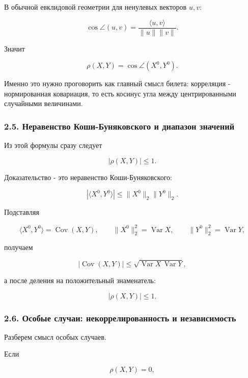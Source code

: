 \documentclass[
  11pt,
  a4paper,
]{article}
\begin{document}
В обычной евклидовой геометрии для ненулевых векторов \(u,v\):

\[
\cos\angle(u,v)
=
\frac{\langle u,v\rangle}{\|u\|\|v\|}.
\]

Значит

\[
\rho(X,Y)=\cos\angle(X^0,Y^0).
\]

Именно это нужно проговорить как главный смысл билета: корреляция -
нормированная ковариация, то есть косинус угла между центрированными
случайными величинами.

\subsubsection{2.5. Неравенство Коши-Буняковского и диапазон
значений}\label{ux43dux435ux440ux430ux432ux435ux43dux441ux442ux432ux43e-ux43aux43eux448ux438-ux431ux443ux43dux44fux43aux43eux432ux441ux43aux43eux433ux43e-ux438-ux434ux438ux430ux43fux430ux437ux43eux43d-ux437ux43dux430ux447ux435ux43dux438ux439}

Из этой формулы сразу следует

\[
|\rho(X,Y)|\le1.
\]

Доказательство - это неравенство Коши-Буняковского:

\[
|\langle X^0,Y^0\rangle|
\le
\|X^0\|_2\|Y^0\|_2.
\]

Подставляя

\[
\langle X^0,Y^0\rangle=\operatorname{Cov}(X,Y),
\qquad
\|X^0\|_2^2=\operatorname{Var}X,
\qquad
\|Y^0\|_2^2=\operatorname{Var}Y,
\]

получаем

\[
|\operatorname{Cov}(X,Y)|
\le
\sqrt{\operatorname{Var}X\,\operatorname{Var}Y},
\]

а после деления на положительный знаменатель:

\[
|\rho(X,Y)|\le1.
\]

\subsubsection{2.6. Особые случаи: некоррелированность и
независимость}\label{ux43eux441ux43eux431ux44bux435-ux441ux43bux443ux447ux430ux438-ux43dux435ux43aux43eux440ux440ux435ux43bux438ux440ux43eux432ux430ux43dux43dux43eux441ux442ux44c-ux438-ux43dux435ux437ux430ux432ux438ux441ux438ux43cux43eux441ux442ux44c}

Разберем смысл особых случаев.

Если

\[
\rho(X,Y)=0,
\]
\end{document}

